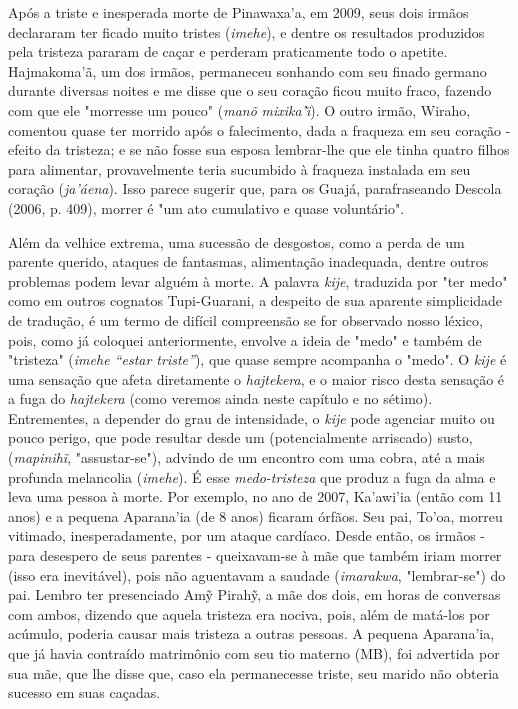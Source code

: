 Após a triste e inesperada morte de Pinawaxa'a, em 2009, seus dois
irmãos declararam ter ficado muito tristes (\emph{imehe}), e dentre os
resultados produzidos pela tristeza pararam de caçar e perderam
praticamente todo o apetite. Hajmakoma'ã, um dos irmãos, permaneceu
sonhando com seu finado germano durante diversas noites e me disse que o
seu coração ficou muito fraco, fazendo com que ele "morresse um pouco"
(\emph{manõ} \emph{mixika'i}̃). O outro irmão, Wiraho, comentou quase ter
morrido após o falecimento, dada a fraqueza em seu coração - efeito da
tristeza; e se não fosse sua esposa lembrar-lhe que ele tinha quatro
filhos para alimentar, provavelmente teria sucumbido à fraqueza
instalada em seu coração (\emph{ja'áena}). Isso parece sugerir que, para
os Guajá, parafraseando Descola (2006, p. 409), morrer é "um ato
cumulativo e quase voluntário".

Além da velhice extrema, uma sucessão de desgostos, como a perda de um
parente querido, ataques de fantasmas, alimentação inadequada, dentre
outros problemas podem levar alguém à morte. A palavra \emph{kije},
traduzida por "ter medo" como em outros cognatos Tupi-Guarani, a
despeito de sua aparente simplicidade de tradução, é um termo de difícil
compreensão se for observado nosso léxico, pois, como já coloquei
anteriormente, envolve a ideia de "medo" e também de "tristeza"
(\emph{imehe ``estar triste''}), que quase sempre acompanha o "medo". O
\emph{kije} é uma sensação que afeta diretamente o \emph{hajtekera}, e o
maior risco desta sensação é a fuga do \emph{hajtekera} (como veremos
ainda neste capítulo e no sétimo). Entrementes, a depender do grau de
intensidade, o \emph{kije} pode agenciar muito ou pouco perigo, que pode
resultar desde um (potencialmente arriscado) susto, (\emph{mapinihĩ},
"assustar-se"), advindo de um encontro com uma cobra, até a mais
profunda melancolia (\emph{imehe}). É esse \emph{medo-tristeza} que
produz a fuga da alma e leva uma pessoa à morte. Por exemplo, no ano de
2007, Ka'awi'ia (então com 11 anos) e a pequena Aparana'ia (de 8 anos)
ficaram órfãos. Seu pai, To'oa, morreu vitimado, inesperadamente, por um
ataque cardíaco. Desde então, os irmãos - para desespero de seus
parentes - queixavam-se à mãe que também iriam morrer (isso era
inevitável), pois não aguentavam a saudade (\emph{imarakwa},
"lembrar-se") do pai. Lembro ter presenciado Amỹ Pirahỹ, a mãe dos dois,
em horas de conversas com ambos, dizendo que aquela tristeza era nociva,
pois, além de matá-los por acúmulo, poderia causar mais tristeza a
outras pessoas. A pequena Aparana'ia, que já havia contraído matrimônio
com seu tio materno (MB), foi advertida por sua mãe, que lhe disse que,
caso ela permanecesse triste, seu marido não obteria sucesso em suas
caçadas.


